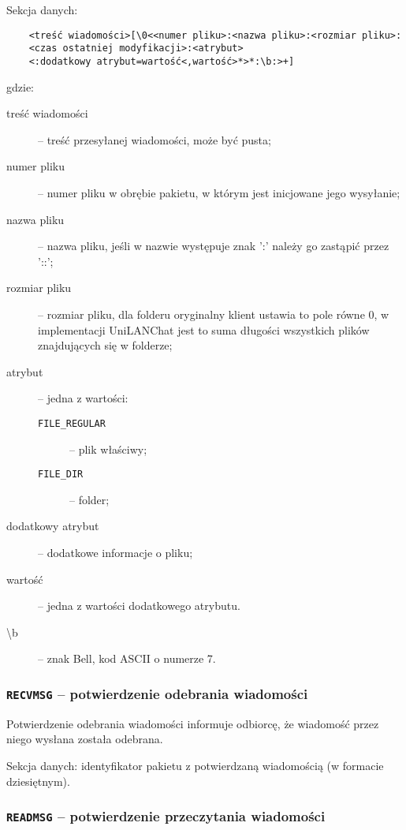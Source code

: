 \documentclass[11pt,leqno]{article}
\begin{document}
Sekcja danych:
\begin{verbatim}
	<treść wiadomości>[\0<<numer pliku>:<nazwa pliku>:<rozmiar pliku>:
	<czas ostatniej modyfikacji>:<atrybut>
	<:dodatkowy atrybut=wartość<,wartość>*>*:\b:>+]
\end{verbatim}
gdzie:
\begin{description}
	\item[treść wiadomości] -- treść przesyłanej wiadomości, może być pusta;
	\item[numer pliku] -- numer pliku w obrębie pakietu, w którym jest inicjowane
	jego wysyłanie;
	\item[nazwa pliku] -- nazwa pliku, jeśli w nazwie występuje znak ':' należy go zastąpić przez '::';
	\item[rozmiar pliku] -- rozmiar pliku, dla folderu oryginalny klient ustawia
	to pole równe 0, w implementacji UniLANChat jest to suma długości wszystkich
	plików znajdujących się w folderze;
	\item[atrybut] -- jedna z wartości:
	\begin{description}
		\item[\textnormal{\texttt{FILE\_REGULAR}}] -- plik właściwy;
		\item[\textnormal{\texttt{FILE\_DIR}}] -- folder;
	\end{description}
	\item[dodatkowy atrybut] -- dodatkowe informacje o pliku;
	\item[wartość] -- jedna z wartości dodatkowego atrybutu.
	\item[\textbackslash b] -- znak Bell, kod ASCII o numerze 7.
\end{description}

\subsubsection{\textnormal{\texttt{RECVMSG}} -- potwierdzenie odebrania wiadomości}

Potwierdzenie odebrania wiadomości informuje odbiorcę, że wiadomość przez niego wysłana została
odebrana.

Sekcja danych: identyfikator pakietu z potwierdzaną wiadomością (w formacie dziesiętnym).


\subsubsection{\textnormal{\texttt{READMSG}} -- potwierdzenie przeczytania wiadomości}
\end{document}
